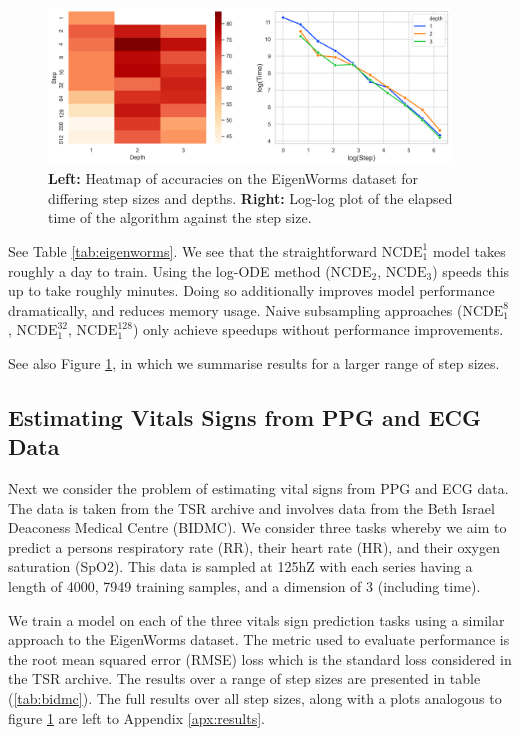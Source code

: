 \begin{figure}
    \centering
    \includegraphics[width=0.95\textwidth]{Images/eigenworms.png}
    \caption{\textbf{Left:} Heatmap of accuracies on the EigenWorms dataset for differing step sizes and depths. \textbf{Right:} Log-log plot of the elapsed time of the algorithm against the step size.}
    \label{fig:eigenworms}
\end{figure}



See Table \ref{tab:eigenworms}. We see that the straightforward $\mathrm{NCDE}^1_1$ model takes roughly a day to train. Using the log-ODE method ($\mathrm{NCDE}_2$, $\mathrm{NCDE}_3$) speeds this up to take roughly minutes. Doing so additionally improves model performance dramatically, and reduces memory usage. Naive subsampling approaches ($\mathrm{NCDE}^{8}_1$, $\mathrm{NCDE}^{32}_1$, $\mathrm{NCDE}^{128}_1$) only achieve speedups without performance improvements.

See also Figure \ref{fig:eigenworms}, in which we summarise results for a larger range of step sizes.

\subsection{Estimating Vitals Signs from PPG and ECG Data}
Next we consider the problem of estimating vital signs from PPG and ECG data. The data is taken from the TSR archive \cite{MonashTSRegressionArchive} and involves data from the Beth Israel Deaconess Medical Centre (BIDMC). We consider three tasks whereby we aim to predict a persons respiratory rate (RR), their heart rate (HR), and their oxygen saturation (SpO2). This data is sampled at 125hZ with each series having a length of 4000, 7949 training samples, and a dimension of 3 (including time).

We train a model on each of the three vitals sign prediction tasks using a similar approach to the EigenWorms dataset. The metric used to evaluate performance is the root mean squared error (RMSE) loss which is the standard loss considered in the TSR archive. The results over a range of step sizes are presented in table (\ref{tab:bidmc}). The full results over all step sizes, along with a plots analogous to figure \ref{fig:eigenworms} are left to Appendix \ref{apx:results}.

